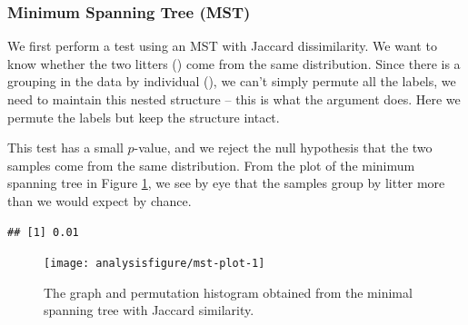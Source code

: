 \subsubsection*{Minimum Spanning Tree (MST)}

We first perform a test using an MST with Jaccard dissimilarity. We
want to know whether the two litters
() come from the same
distribution. Since there is a grouping in the data by individual
(), we can't simply permute all the
labels, we need to maintain this nested structure -- this is what the
 argument does. Here we permute the
 labels but keep the
 structure intact.

This test has a small $p$-value, and we reject the null hypothesis
that the two samples come from the same distribution. From the plot of
the minimum spanning tree in Figure \ref{fig:mst-plot}, we see by eye that
the samples group by litter more than we would expect by chance.

\begin{knitrout}
\color{fgcolor}\begin{kframe}
\begin{alltt}
 \hlkwb{<-}  \hlstd{,}  \hlstd{=} \hlstd{,}
                       \hlstd{=} \hlstd{,}  \hlstd{=} \hlstd{)}
\hlopt{$}
\end{alltt}
\begin{verbatim}
## [1] 0.01
\end{verbatim}
\end{kframe}
\end{knitrout}

\begin{figure}[H]
\begin{knitrout}
\color{fgcolor}\begin{kframe}
\begin{alltt}
\hlkwb{=} \hlopt{+} \hlstd{(} \hlstd{=} \hlstd{(} \hlstd{=} \hlstd{),}
         \hlstd{=} \hlstd{(} \hlstd{=} \hlstd{))}
\hlkwb{=}
\hlstd{(} \hlstd{=} 
\end{alltt}
\end{kframe}

{\centering \texttt{[image: analysisfigure/mst-plot-1]} 

}



\end{knitrout}
\caption{The graph and permutation histogram obtained from the minimal
  spanning tree with Jaccard similarity.}
\label{fig:mst-plot}
\end{figure}

